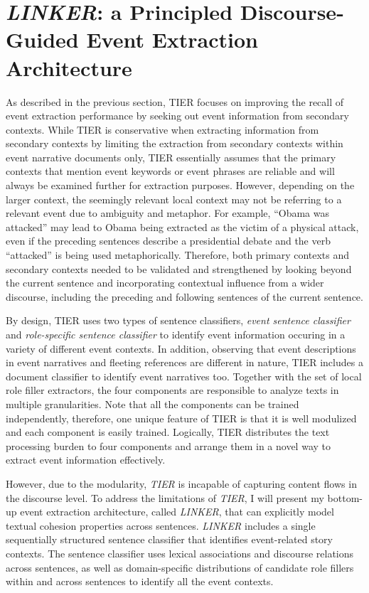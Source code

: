 \chapter{{\it LINKER}: a Principled Discourse-Guided Event Extraction Architecture}
\label{Chapter:LINKER}
As described in the previous section, TIER focuses on improving the recall of event extraction 
performance by seeking out event information from secondary contexts. 
While TIER is conservative when extracting information from secondary contexts 
by limiting the extraction from secondary contexts 
within event narrative documents only, 
TIER essentially assumes that the primary contexts that 
mention event keywords or event phrases 
are reliable and will always be examined further 
for extraction purposes.  However, depending on the larger context, 
the seemingly relevant local context may not be 
referring to a relevant event due to ambiguity and metaphor. For example, ``Obama was
attacked'' may lead to Obama being extracted as the victim of a
physical attack, even if the preceding sentences describe a
presidential debate and the verb ``attacked'' is being used
metaphorically. 
Therefore, both primary contexts and secondary contexts 
needed to be validated and strengthened by looking beyond 
the current sentence and incorporating contextual influence 
from a wider discourse, including the preceding and following 
sentences of the current sentence.  

By design, TIER uses two types of sentence classifiers, 
{\it event sentence classifier} and {\it role-specific sentence classifier} 
to identify event information occuring in a variety of different event contexts. 
In addition, observing that event descriptions in event narratives 
and fleeting references are different in nature, 
TIER includes a document classifier to identify event narratives too. 
Together with the set of local role filler extractors, the four components 
are responsible to analyze texts in multiple granularities.
Note that all the components can be trained independently, 
therefore, one unique feature of TIER is that it is well modulized and 
each component is easily trained.
Logically, TIER distributes the text processing burden to four components 
and arrange them in a novel way to extract event information effectively. 

However, due to the modularity, {\it TIER} is incapable of 
capturing content flows in the discourse level. 
To address the limitations of {\it TIER}, I will present my bottom-up 
event extraction architecture, called {\it LINKER}, that can explicitly 
model textual cohesion properties across sentences.
{\it LINKER} includes a single sequentially structured
  sentence classifier that identifies event-related story
  contexts. The sentence classifier uses lexical associations and
  discourse relations across sentences, as well as domain-specific
  distributions of candidate role fillers within and across sentences 
  to identify all the event contexts.

